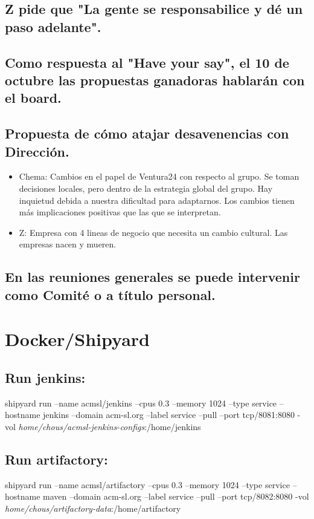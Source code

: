 \documentclass[11pt]{article}
\begin{document}
\subsection{Z pide que "La gente se responsabilice y dé un paso adelante".}
\label{sec-2-3}
\subsection{Como respuesta al "Have your say", el 10 de octubre las propuestas ganadoras hablarán con el board.}
\label{sec-2-4}
\subsection{Propuesta de cómo atajar desavenencias con Dirección.}
\label{sec-2-5}
\begin{itemize}
\item Chema: Cambios en el papel de Ventura24 con respecto al grupo. Se toman decisiones locales, pero dentro de la estrategia global del grupo. Hay inquietud debida a nuestra dificultad para adaptarnos. Los cambios tienen más implicaciones positivas que las que se interpretan.
\item Z: Empresa con 4 lineas de negocio que necesita un cambio cultural. Las empresas nacen y mueren.
\end{itemize}
\subsection{En las reuniones generales se puede intervenir como Comité o a título personal.}
\label{sec-2-6}
\section{Docker/Shipyard}
\label{sec-3}
\subsection{Run jenkins:}
\label{sec-3-1}
shipyard run --name acmsl/jenkins --cpus 0.3 --memory 1024 --type service --hostname jenkins --domain acm-sl.org --label service --pull --port tcp/8081:8080 -vol \emph{home/chous/acmsl-jenkins-configs}:/home/jenkins
\subsection{Run artifactory:}
\label{sec-3-2}
shipyard run --name acmsl/artifactory --cpus 0.3 --memory 1024 --type service --hostname maven --domain acm-sl.org --label service --pull --port tcp/8082:8080 -vol \emph{home/chous/artifactory-data}:/home/artifactory
\end{document}
